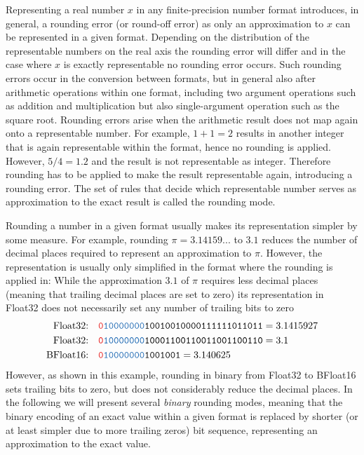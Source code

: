 Representing a real number $x$ in any finite-precision number format introduces, in general, a rounding error (or round-off error) as
only an approximation to $x$ can be represented in a given format. Depending on the distribution of the representable numbers on the
real axis the rounding error will differ and in the case where $x$ is exactly representable no rounding error occurs. Such rounding errors
occur in the conversion between formats, but in general also after arithmetic operations within one format, including two argument
operations such as addition and multiplication but also single-argument operation such as the square root. Rounding errors arise when
the arithmetic result does not map again onto a representable number. For example, $1+1 = 2$ results in another integer that is again
representable within the format, hence no rounding is applied. However, $5/4 = 1.2$ and the result is not representable as integer.
Therefore rounding has to be applied to make the result representable again, introducing a rounding error. The set of rules that decide
which representable number serves as approximation to the exact result is called the rounding mode.

Rounding a number in a given format usually makes its representation simpler by some measure. For example, rounding $\pi = 3.14159...$
to $3.1$ reduces the number of decimal places required to represent an approximation to $\pi$. However, the representation is usually
only simplified in the format where the rounding is applied in: While the approximation $3.1$ of $\pi$ requires less decimal places (meaning
that trailing decimal places are set to zero) its representation in Float32 does not necessarily set any number of trailing bits to zero
\begin{align}
\text{Float32:}& \quad \mathtt{{\color{psign}0}{\color{pexpo}10000000}10010010000111111011011} = 3.1415927 \nonumber \\
\text{Float32:}& \quad \mathtt{{\color{psign}0}{\color{pexpo}10000000}10001100110011001100110} = 3.1 \nonumber \\
\text{BFloat16:}& \quad \mathtt{{\color{psign}0}{\color{pexpo}10000000}1001001} = 3.140625
\end{align}
However, as shown in this example, rounding in binary from Float32 to BFloat16 sets trailing bits to zero, but does not considerably
reduce the decimal places. In the following we will present several \emph{binary} rounding modes, meaning that the binary encoding
of an exact value within a given format is replaced by shorter (or at least simpler due to more trailing zeros) bit sequence, representing
an approximation to the exact value.

